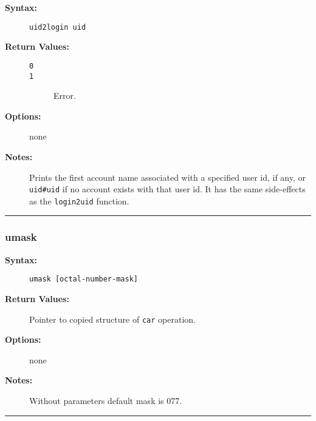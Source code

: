 \begin{description}
\item[{\bf Syntax:}] \mbox{}

{\tt uid2login uid}

\item[{\bf Return Values:}] \mbox{}

\begin{description}
\item[{\tt 0}] \mbox{}



\item[{\tt 1}] \mbox{}

Error.

\end{description}


\item[{\bf Options:}] \mbox{}

none  

\item[{\bf Notes:}] \mbox{}

Prints the first account name associated with 
a specified user id, if any, or {\tt uid\#uid} if no account 
exists with that user id. It has the same side-effects as the 
{\tt login2uid} function. 

\end{description}


\hrule
\subsubsection{umask}

\begin{description}
\item[{\bf Syntax:}] \mbox{}

{\tt umask [octal-number-mask]}

\item[{\bf Return Values:}] \mbox{}

Pointer to copied structure of {\tt car} 
operation.

\item[{\bf Options:}] \mbox{}

none  

\item[{\bf Notes:}] \mbox{}

Without parameters default mask is 077.

\end{description}


\hrule
